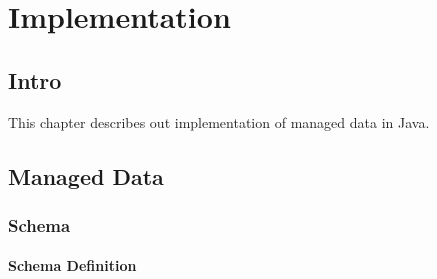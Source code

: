 



\chapter{Implementation}\label{Implementation}
\section{Intro}\label{sec:Intro Implementation}
This chapter describes out implementation of managed data in Java.

\section{Managed Data}\label{sec:Managed Data Implementation}

\subsection{Schema}\label{subsec:Schema Implementation}

\subsubsection{Schema Definition}\label{Schema Definition}

